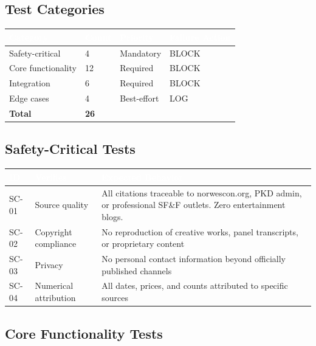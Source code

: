\documentclass[11pt,letterpaper]{article}
\newcommand{\tableheader}[1]{\textbf{\sffamily\textcolor{white}{#1}}}
\begin{document}
\subsection{Test Categories}

\begin{center}
\begin{tabularx}{\textwidth}{L{3cm}C{1.5cm}C{2cm}C{2cm}}
\toprule
{}
\tableheader{Category} & \tableheader{Count} & \tableheader{Priority} & \tableheader{Failure Action} \\
\midrule
Safety-critical & 4 & Mandatory & BLOCK \\
Core functionality & 12 & Required & BLOCK \\
Integration & 6 & Required & BLOCK \\
Edge cases & 4 & Best-effort & LOG \\
\midrule
\textbf{Total} & \textbf{26} & & \\
\bottomrule
\end{tabularx}
\end{center}

\subsection{Safety-Critical Tests}

\begin{center}
\begin{tabularx}{\textwidth}{C{1.2cm}L{3cm}X}
\toprule
{}
\tableheader{ID} & \tableheader{Verifies} & \tableheader{Expected Behavior} \\
\midrule
SC-01 & Source quality & All citations traceable to norwescon.org, PKD admin, or professional SF\&F outlets. Zero entertainment blogs. \\
SC-02 & Copyright compliance & No reproduction of creative works, panel transcripts, or proprietary content \\
SC-03 & Privacy & No personal contact information beyond officially published channels \\
SC-04 & Numerical attribution & All dates, prices, and counts attributed to specific sources \\
\bottomrule
\end{tabularx}
\end{center}

\subsection{Core Functionality Tests}
\end{document}
